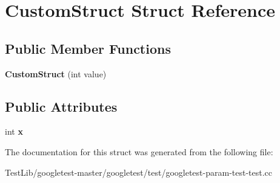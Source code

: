 \hypertarget{structCustomStruct}{}\section{Custom\+Struct Struct Reference}
\label{structCustomStruct}
\subsection*{Public Member Functions}
\begin{DoxyCompactItemize}
\item 
\mbox{\label{structCustomStruct_aeab194957ba9e056e81c721e83c61941}} 
{\bfseries Custom\+Struct} (int value)
\end{DoxyCompactItemize}
\subsection*{Public Attributes}
\begin{DoxyCompactItemize}
\item 
\mbox{\label{structCustomStruct_a436b0c2ffdab1f711fa40cfa3e246602}} 
int {\bfseries x}
\end{DoxyCompactItemize}


The documentation for this struct was generated from the following file\+:\begin{DoxyCompactItemize}
\item 
Test\+Lib/googletest-\/master/googletest/test/googletest-\/param-\/test-\/test.\+cc\end{DoxyCompactItemize}
